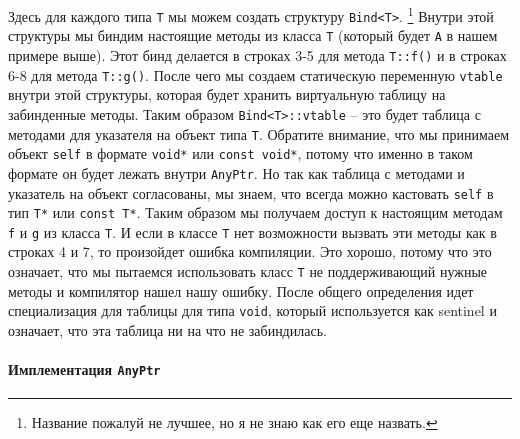 Здесь для каждого типа \texttt{T} мы можем создать структуру \texttt{Bind<T>}.%
\footnote{Название пожалуй не лучшее, но я не знаю как его еще назвать.}
Внутри этой структуры мы биндим настоящие методы из класса \texttt{T} (который будет \texttt{A} в нашем примере выше).
Этот бинд делается в строках 3-5 для метода \texttt{T::f()} и в строках 6-8 для метода \texttt{T::g()}.
После чего мы создаем статическую переменную \texttt{vtable} внутри этой структуры, которая будет хранить виртуальную таблицу на забинденные методы.
Таким образом \texttt{Bind<T>::vtable} -- это будет таблица с методами для указателя на объект типа \texttt{T}.
Обратите внимание, что мы принимаем объект \texttt{self} в формате \texttt{void*} или \texttt{const void*}, потому что именно в таком формате он будет лежать внутри \texttt{AnyPtr}.
Но так как таблица с методами и указатель на объект согласованы, мы знаем, что всегда можно кастовать \texttt{self} в тип \texttt{T*} или \texttt{const T*}.
Таким образом мы получаем доступ к настоящим методам \texttt{f} и \texttt{g} из класса \texttt{T}.
И если в классе \texttt{T} нет возможности вызвать эти методы как в строках 4 и 7, то произойдет ошибка компиляции.
Это хорошо, потому что это означает, что мы пытаемся использовать класс \texttt{T} не поддерживающий нужные методы и компилятор нашел нашу ошибку.
После общего определения идет специализация для таблицы для типа \texttt{void}, который используется как sentinel и означает, что эта таблица ни на что не забиндилась.

\paragraph{Имплементация \texttt{AnyPtr}}

